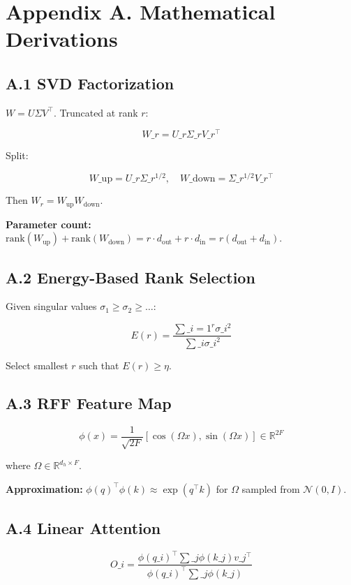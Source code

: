 
\section{Appendix A. Mathematical Derivations}

\subsection{A.1 SVD Factorization}

$W = U \Sigma V^\top$. Truncated at rank $r$:

\[
W\_r = U\_r \Sigma\_r V\_r^\top
\]

Split:

\[
W\_\text{up} = U\_r \Sigma\_r^{1/2}, \quad W\_\text{down} = \Sigma\_r^{1/2} V\_r^\top
\]

Then $W_r = W_\text{up} W_\text{down}$.

\textbf{Parameter count:} $\text{rank}(W_\text{up}) + \text{rank}(W_\text{down}) = r \cdot d_\text{out} + r \cdot d_\text{in} = r(d_\text{out} + d_\text{in})$.

\subsection{A.2 Energy-Based Rank Selection}

Given singular values $\sigma_1 \geq \sigma_2 \geq \dots$:

\[
E(r) = \frac{\sum\_{i=1}^{r} \sigma\_i^2}{\sum\_i \sigma\_i^2}
\]

Select smallest $r$ such that $E(r) \geq \eta$.

\subsection{A.3 RFF Feature Map}

\[
\phi(x) = \frac{1}{\sqrt{2F}} [\cos(\Omega x), \sin(\Omega x)] \in \mathbb{R}^{2F}
\]

where $\Omega \in \mathbb{R}^{d_h \times F}$.

\textbf{Approximation:} $\phi(q)^\top \phi(k) \approx \exp(q^\top k)$ for 
$\Omega$ sampled from $\mathcal{N}(0, I)$.

\subsection{A.4 Linear Attention}

\[
O\_i = \frac{\phi(q\_i)^\top \sum\_j \phi(k\_j) v\_j^\top}{\phi(q\_i)^\top \sum\_j \phi(k\_j)}
\]


